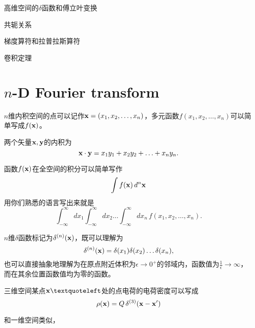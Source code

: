 \documentclass[CJK]{beamer}
\date{}
\begin{document}




\begin{frame}
\bch
\bitem
\item{高维空间的$\delta$函数和傅立叶变换}
\item{共轭关系}
\item{梯度算符和拉普拉斯算符}
\item{卷积定理}    
\eitem
\ech
\end{frame}




\section{$n$-D Fourier transform}


\begin{frame}
  \bch
  $n$维内积空间的点可以记作${\mathbf{x}} = (x_1, x_2, \ldots, x_n)$，多元函数$f(x_1, x_2, \ldots, x_n)$可以简单写成$f({\mathbf{x}})$。

  \skipline
  
  两个矢量${\mathbf{x}}, {\mathbf{y}}$的内积为
 {\blue $$ {\mathbf{x}}\cdot{\mathbf{y}} = x_1y_1+x_2y_2+\ldots + x_n y_n .$$}

  \skipline

  函数$f({\mathbf{x}})$在全空间的积分可以简单写作
 {\blue $$\int f({\mathbf{x}})\, d^n{\mathbf{x}} $$}
  用你们熟悉的语言写出来就是
  $$\int_{-\infty}^\infty d x_1 \int_{-\infty}^\infty dx_2 \ldots \int_{-\infty}^\infty d x_n\, f(x_1, x_2, \ldots, x_n). $$

  \ech
  \end{frame}

\begin{frame}
  \bch
  $n$维$\delta$函数标记为{\blue $\delta^{(n)}({\mathbf{x}})$}，既可以理解为
      {\blue
        $$\delta^{(n)}({\mathbf{x}}) = \delta(x_1)\delta(x_2)\ldots\delta(x_n), $$
      }
      也可以直接抽象地理解为{\blue 在原点附近体积为$\epsilon \rightarrow 0^+$的邻域内，函数值为$\frac{1}{\epsilon}\rightarrow \infty $，而在其余位置函数值均为零的函数。}

      \skiplines
      
\bex
三维空间某点$\vecx‘$处的点电荷的电荷密度可以写成
$$\rho({\mathbf{x}}) = Q\, \delta^{(3)}({\mathbf{x}} - {\mathbf{x}}')$$
\eex
  \ech
\end{frame}

\begin{frame}
  \bch
  和一维空间类似，
  \ech
\end{frame}
\end{document}

